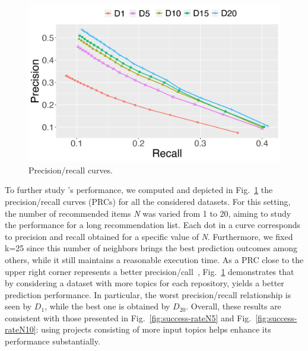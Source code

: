


\begin{figure}[h!]
	\centering
	\vspace{-.2cm}
	\includegraphics[width=0.90\linewidth]{figs/PrecisionRecallCurve.png}
	\vspace{-.2cm}
	\caption{Precision/recall curves.}%
	\vspace{-.2cm}
	\label{fig:configs}
\end{figure}


To further study \TF's performance, we computed and depicted in Fig.~\ref{fig:configs} the precision/recall curves (PRCs) for all the considered datasets. 
For this setting, the number of recommended items \emph{N} was varied from 1 to 20, aiming to study the performance for a long recommendation list. Each dot in a curve corresponds to precision and recall obtained for a specific value of \emph{N}. Furthermore, we fixed k=25 since this number of neighbors brings the best prediction outcomes among others, while it still maintains a reasonable execution time. As a PRC close to the upper right corner represents a better precision/call~\cite{NGUYEN2020110460}, Fig.~\ref{fig:configs} demonstrates that by considering a dataset with more topics for each repository, \TFa yields a better prediction performance. In particular, the worst precision/recall relationship is seen by $D_{1}$, while the best one is obtained by $D_{20}$. Overall, these results are consistent with those presented in Fig.~\ref{fig:success-rateN5} and Fig.~\ref{fig:success-rateN10}: using projects consisting of more input topics helps \TFa enhance its performance substantially.


